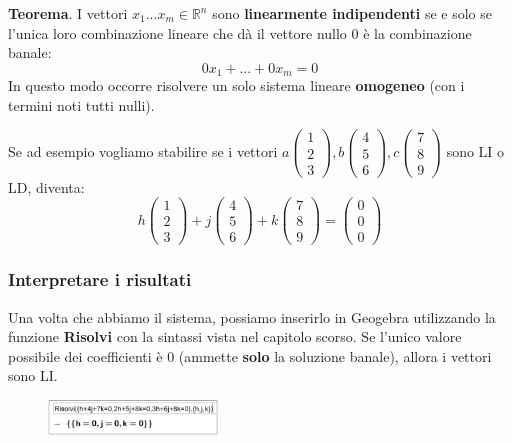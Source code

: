 \documentclass[../main.tex]{subfiles}
\begin{document}
\textbf{Teorema}. I vettori $x_1...x_m \in \mathbb{R}^n$ sono \textbf{linearmente indipendenti} se e solo se l'unica loro combinazione lineare
che dà il vettore nullo $0$ è la combinazione banale:
$$
    0x_1 + ... + 0x_m = 0
$$
In questo modo occorre risolvere un solo sistema lineare \textbf{omogeneo} (con i termini noti tutti nulli).

Se ad esempio vogliamo stabilire se i vettori $a \begin{pmatrix}1 \\ 2 \\ 3 \end{pmatrix}, b \begin{pmatrix}4 \\ 5 \\ 6 \end{pmatrix}, c \begin{pmatrix}7 \\ 8 \\ 9 \end{pmatrix}$
sono LI o LD, diventa:
$$
    h \begin{pmatrix}
        1 \\
        2 \\
        3
    \end{pmatrix}
    +j \begin{pmatrix}
        4 \\
        5 \\
        6
    \end{pmatrix}
    +k \begin{pmatrix}
        7 \\
        8 \\
        9
    \end{pmatrix}
    = \begin{pmatrix}
       0 \\
       0 \\
       0
    \end{pmatrix}
$$

\vspace{1cm}
\subsubsection{Interpretare i risultati}
Una volta che abbiamo il sistema, possiamo inserirlo in Geogebra utilizzando la funzione \textbf{Risolvi} con la sintassi vista nel capitolo
scorso. Se l'unico valore possibile dei coefficienti è $0$ (ammette \textbf{solo} la soluzione banale), allora i vettori sono LI.
\begin{figure}[h]
    \centering
    \includegraphics[width=0.4\textwidth]{../images/casLI.png}
\end{figure}
\end{document}
